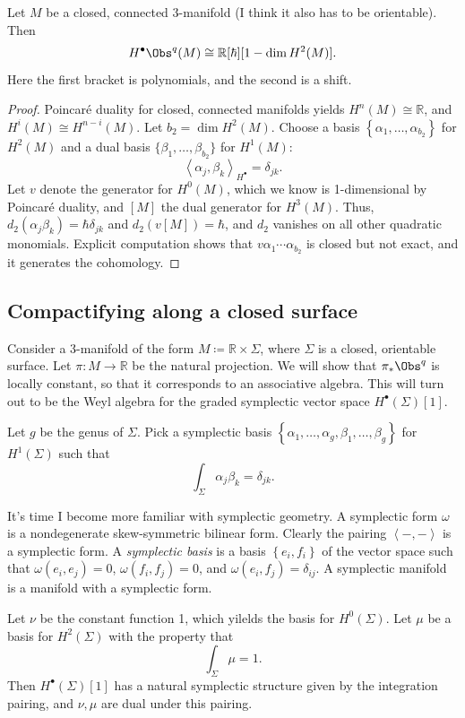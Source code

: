 \begin{lemma}\label{lma:4-5-1}
	Let $M$ be a closed, connected 3-manifold (I think it also has to be orientable). Then
	\[
		H^{\bullet} \Obs^{q} (M) \cong \mathbb{R} [\hbar ][1-\dim H^2(M)]
	.\]
	Here the first bracket is polynomials, and the second is a shift.
\end{lemma}
\begin{proof}
	Poincar\'e duality for closed, connected manifolds yields $H^n(M) \cong \mathbb{R} $, and $H^i(M) \cong H^{n-i} (M)$. Let $b_2 = \dim H^2(M)$. Choose a basis $\left\{ \alpha _1, \ldots ,\alpha _{b_2}  \right\}$ for $H^2(M)$ and a dual basis $\{\beta _1, \ldots ,\beta _{b_2} \}$ for $H^1(M)$:
	\[
		\left\langle \alpha _j,\beta _k \right\rangle_{H^{\bullet} } =\delta _{jk} 
	.\]
	Let $v$ denote the generator for $H^0(M)$, which we know is 1-dimensional by Poincar\'e duality, and $[M]$ the dual generator for $H^3(M)$. Thus, $d_2(\alpha _j\beta _k)=\hbar \delta _{jk} $ and $d_2(v[M])=\hbar $, and $d_2$ vanishes on all other quadratic monomials. Explicit computation shows that $v\alpha _1 \cdots \alpha _{b_2} $ is closed but not exact, and it generates the cohomology.
\end{proof}

\subsection{Compactifying along a closed surface}

Consider a 3-manifold of the form $M\coloneqq\mathbb{R} \times \Sigma $, where $\Sigma $ is a closed, orientable surface. Let $\pi : M \to \mathbb{R} $ be the natural projection. We will show that $\pi _*\Obs^{q} $ is locally constant, so that it corresponds to an associative algebra. This will turn out to be the Weyl algebra for the graded symplectic vector space $H^{\bullet} (\Sigma )[1]$.

Let $g$ be the genus of $\Sigma $. Pick a symplectic basis $\left\{ \alpha _1, \ldots , \alpha _g, \beta _1, \ldots , \beta _g \right\} $ for $H^1(\Sigma )$ such that
\[
	\int_{\Sigma } \alpha _j\beta _k = \delta _{jk} 
.\]
\begin{remark}
	It's time I become more familiar with symplectic geometry. A symplectic form $\omega $ is a nondegenerate skew-symmetric bilinear form. Clearly the pairing $\left\langle -,- \right\rangle $ is a symplectic form. A \emph{symplectic basis} is a basis $\left\{ e_i,f_i \right\} $ of the vector space such that $\omega (e_i,e_j)=0$, $\omega (f_i,f_j)=0$, and $\omega (e_i,f_j)=\delta _{ij} $. A symplectic manifold is a manifold with a symplectic form.
\end{remark}
Let $\nu $ be the constant function 1, which yilelds the basis for $H^0(\Sigma )$. Let $\mu $ be a basis for $H^2(\Sigma)$ with the property that
\[
	\int_{\Sigma } \mu =1
.\]
Then $H^{\bullet} (\Sigma )[1]$ has a natural symplectic structure given by the integration pairing, and $\nu ,\mu $ are dual under this pairing.


